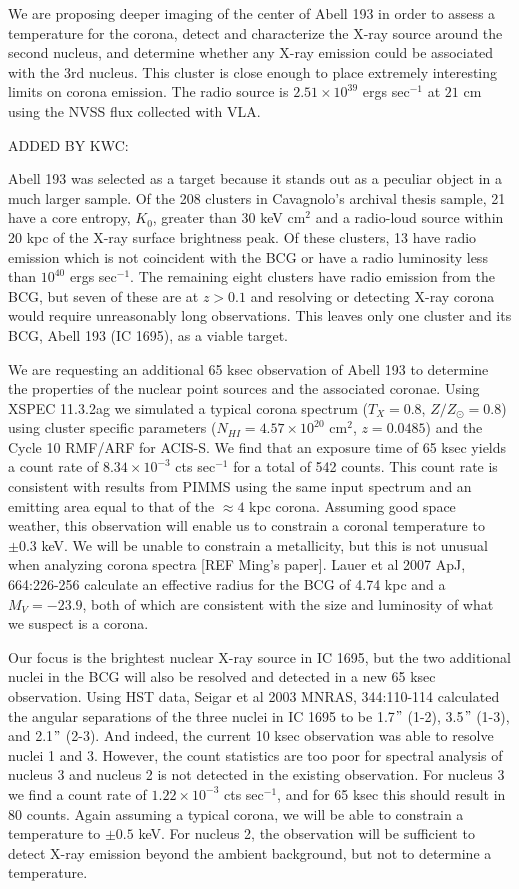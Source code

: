 \documentclass[letterpaper,11pt]{article}
\begin{document}
We are proposing deeper imaging of the center of Abell 193 in order to
assess a temperature for the corona, detect and characterize the X-ray
source around the second nucleus, and determine whether any X-ray
emission could be associated with the 3rd nucleus. This cluster is
close enough to place extremely interesting limits on corona
emission. The radio source is $2.51\times10^{39}$ ergs sec$^{-1}$ at
$21$ cm using the NVSS flux collected with VLA.

ADDED BY KWC:

Abell 193 was selected as a target because it stands out as a peculiar
object in a much larger sample. Of the 208 clusters in Cavagnolo's
archival thesis sample, 21 have a core entropy, $K_0$, greater than 30
keV cm$^2$ and a radio-loud source within 20 kpc of the X-ray surface
brightness peak. Of these clusters, 13 have radio emission which is
not coincident with the BCG or have a radio luminosity less than
$10^{40}$ ergs sec$^{-1}$. The remaining eight clusters have radio
emission from the BCG, but seven of these are at $z>0.1$ and resolving
or detecting X-ray corona would require unreasonably long
observations. This leaves only one cluster and its BCG, Abell 193 (IC
1695), as a viable target.

We are requesting an additional 65 ksec observation of Abell 193 to
determine the properties of the nuclear point sources and the
associated coronae. Using XSPEC 11.3.2ag we simulated a typical corona
spectrum ($T_X=0.8$, $Z/Z_{\odot}=0.8$) using cluster specific
parameters ($N_{HI}=4.57\times10^{20}$ cm$^2$, $z=0.0485$) and the
Cycle 10 RMF/ARF for ACIS-S. We find that an exposure time of 65 ksec
yields a count rate of $8.34\times10^{-3}$ cts sec$^{-1}$ for a total
of 542 counts. This count rate is consistent with results from PIMMS
using the same input spectrum and an emitting area equal to that of
the $\approx4$ kpc corona. Assuming good space weather, this
observation will enable us to constrain a coronal temperature to
$\pm0.3$ keV. We will be unable to constrain a metallicity, but this
is not unusual when analyzing corona spectra [REF Ming's paper].
Lauer et al 2007 ApJ, 664:226-256 calculate an effective radius for
the BCG of 4.74 kpc and a $M_V=-23.9$, both of which are consistent
with the size and luminosity of what we suspect is a corona.

Our focus is the brightest nuclear X-ray source in IC 1695, but the
two additional nuclei in the BCG will also be resolved and detected in
a new 65 ksec observation. Using HST data, Seigar et al 2003 MNRAS,
344:110-114 calculated the angular separations of the three nuclei in
IC 1695 to be 1.7$"$ (1-2), 3.5$"$ (1-3), and 2.1$"$
(2-3). And indeed, the current 10 ksec observation was able to resolve
nuclei 1 and 3. However, the count statistics are too poor for
spectral analysis of nucleus 3 and nucleus 2 is not detected in the
existing observation. For nucleus 3 we find a count rate of
$1.22\times10^{-3}$ cts sec$^{-1}$, and for 65 ksec this should result
in 80 counts. Again assuming a typical corona, we will be able to
constrain a temperature to $\pm 0.5$ keV. For nucleus 2, the
observation will be sufficient to detect X-ray emission beyond the
ambient background, but not to determine a temperature.
\end{document}
